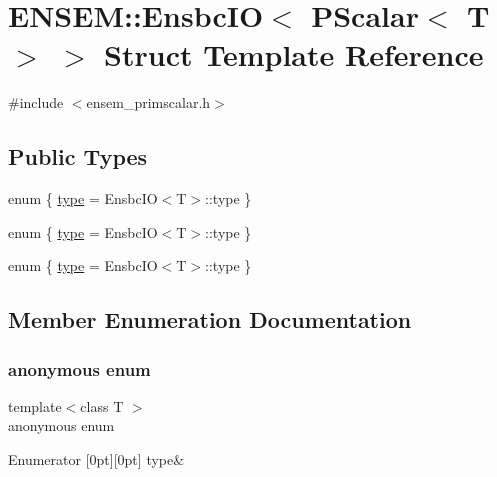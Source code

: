 \hypertarget{structENSEM_1_1EnsbcIO_3_01PScalar_3_01T_01_4_01_4}{}\section{E\+N\+S\+EM\+:\+:Ensbc\+IO$<$ P\+Scalar$<$ T $>$ $>$ Struct Template Reference}
\label{structENSEM_1_1EnsbcIO_3_01PScalar_3_01T_01_4_01_4}


{\ttfamily \#include $<$ensem\+\_\+primscalar.\+h$>$}

\subsection*{Public Types}
\begin{DoxyCompactItemize}
\item 
enum \{ \mbox{\hyperlink{structENSEM_1_1EnsbcIO_3_01PScalar_3_01T_01_4_01_4_a4bfcfcf59e4d4638f8afc7ba98dc93baadebfddcd965322a309c382c575cb6970}{type}} = Ensbc\+IO$<$T$>$\+:\+:type
 \}
\item 
enum \{ \mbox{\hyperlink{structENSEM_1_1EnsbcIO_3_01PScalar_3_01T_01_4_01_4_a4bfcfcf59e4d4638f8afc7ba98dc93baadebfddcd965322a309c382c575cb6970}{type}} = Ensbc\+IO$<$T$>$\+:\+:type
 \}
\item 
enum \{ \mbox{\hyperlink{structENSEM_1_1EnsbcIO_3_01PScalar_3_01T_01_4_01_4_a4bfcfcf59e4d4638f8afc7ba98dc93baadebfddcd965322a309c382c575cb6970}{type}} = Ensbc\+IO$<$T$>$\+:\+:type
 \}
\end{DoxyCompactItemize}


\subsection{Member Enumeration Documentation}
\mbox{\label{structENSEM_1_1EnsbcIO_3_01PScalar_3_01T_01_4_01_4_ade348c43ef0a6a0df9afcee5dadba957}} 
\subsubsection{\texorpdfstring{anonymous enum}{anonymous enum}}
{\footnotesize\ttfamily template$<$class T $>$ \\
anonymous enum}

\begin{DoxyEnumFields}{Enumerator}
[0pt][0pt]{}\mbox{\label{structENSEM_1_1EnsbcIO_3_01PScalar_3_01T_01_4_01_4_a4bfcfcf59e4d4638f8afc7ba98dc93baadebfddcd965322a309c382c575cb6970}} 
type&\\
\hline

\end{DoxyEnumFields}
\mbox{\label{structENSEM_1_1EnsbcIO_3_01PScalar_3_01T_01_4_01_4_aea593b64df001e284963f1af5cf466ff}} 

